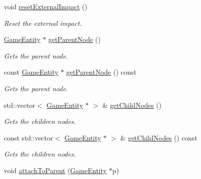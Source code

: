 \begin{DoxyCompactItemize}
void \mbox{\hyperlink{class_game_entity_af93afa90123d253bdf8b13ebe6c6ad95}{reset\+External\+Impact}} ()
\begin{DoxyCompactList}\small\item\em Reset the external impact. \end{DoxyCompactList}\item 
\mbox{\label{class_game_entity_a023eb5d26cd77e0abb87cbe66ace2b72}} 
\mbox{\hyperlink{class_game_entity}{Game\+Entity}} $\ast$ \mbox{\hyperlink{class_game_entity_a023eb5d26cd77e0abb87cbe66ace2b72}{get\+Parent\+Node}} ()
\begin{DoxyCompactList}\small\item\em Gets the parent node. \end{DoxyCompactList}\item 
\mbox{\label{class_game_entity_af602bac2a7658d45ee11e1c69321cab9}} 
const \mbox{\hyperlink{class_game_entity}{Game\+Entity}} $\ast$ \mbox{\hyperlink{class_game_entity_af602bac2a7658d45ee11e1c69321cab9}{get\+Parent\+Node}} () const
\begin{DoxyCompactList}\small\item\em Gets the parent node. \end{DoxyCompactList}\item 
\mbox{\label{class_game_entity_a665846004d70c23c51e5de7201a7213e}} 
std\+::vector$<$ \mbox{\hyperlink{class_game_entity}{Game\+Entity}} $\ast$ $>$ \& \mbox{\hyperlink{class_game_entity_a665846004d70c23c51e5de7201a7213e}{get\+Child\+Nodes}} ()
\begin{DoxyCompactList}\small\item\em Gets the children nodes. \end{DoxyCompactList}\item 
\mbox{\label{class_game_entity_a2fbb424976ac1ec0dcad5e910fc94940}} 
const std\+::vector$<$ \mbox{\hyperlink{class_game_entity}{Game\+Entity}} $\ast$ $>$ \& \mbox{\hyperlink{class_game_entity_a2fbb424976ac1ec0dcad5e910fc94940}{get\+Child\+Nodes}} () const
\begin{DoxyCompactList}\small\item\em Gets the children nodes. \end{DoxyCompactList}\item 
void \mbox{\hyperlink{class_game_entity_ae20fd519ff9c0a17ebdbebe186cfb30a}{attach\+To\+Parent}} (\mbox{\hyperlink{class_game_entity}{Game\+Entity}} $\ast$p)

\end{DoxyCompactItemize}
